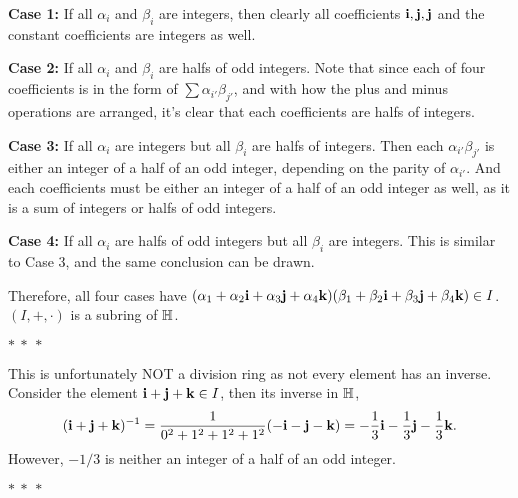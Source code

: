 \documentclass[12pt]{article}
\begin{document}
\begin{fproof}[Jacobson 2.4.5]
    \textbf{Case 1:}
    If all \(\alpha_i\) and \(\beta_i\) are integers, then clearly all coefficients \(\mathbf{i}, \mathbf{j}, \mathbf{j}\) and the constant coefficients are integers as well.

    \textbf{Case 2:} If all \(\alpha_i\) and \(\beta_i\) are halfs of odd integers.
    Note that since each of four coefficients is in the form of \(\sum \alpha_{i'} \beta_{j'}\), and with how the plus and minus operations are arranged, it's clear that each coefficients are halfs of integers.

    \textbf{Case 3:} If all \(\alpha_i\) are integers but all \(\beta_i\) are halfs of integers.
    Then each \(\alpha_{i'}\beta_{j'}\) is either an integer of a half of an odd integer, depending on the parity of \(\alpha_{i'}\).
    And each coefficients must be either an integer of a half of an odd integer as well, as it is a sum of integers or halfs of odd integers.

    \textbf{Case 4:} If all \(\alpha_i\) are halfs of odd integers but all \(\beta_i\) are integers. This is similar to Case 3, and the same conclusion can be drawn.

    Therefore, all four cases have \((\alpha_1 + \alpha_2\mathbf{i} + \alpha_3 \mathbf{j} + \alpha_4\mathbf{k})(\beta_1 + \beta_2\mathbf{i} + \beta_3 \mathbf{j} + \beta_4\mathbf{k}) \in I\).
    \((I, +, \cdot)\) is a subring of \(\mathbb {H}\).

    \begin{center}
        \(\ast~\ast~\ast\)
    \end{center}

    This is unfortunately NOT a division ring as not every element has an inverse.
    Consider the element \(\mathbf{i} + \mathbf{j} + \mathbf{k} \in I\), then its inverse in \(\mathbb {H}\),
    \begin{align*}
        (\mathbf{i} + \mathbf{j} + \mathbf{k})^{-1}  = \frac{1}{0^2+1^2+1^2+1^2}(-\mathbf{i}-\mathbf{j}-\mathbf{k}) = -\frac{1}{3}\mathbf{i} - \frac{1}{3} \mathbf{j} - \frac{1}{3} \mathbf{k}.
    \end{align*}
    However, \(-1/3\) is neither an integer of a half of an odd integer.

    \begin{center}
        \(\ast~\ast~\ast\)
    \end{center}
    

\end{fproof}
\end{document}

